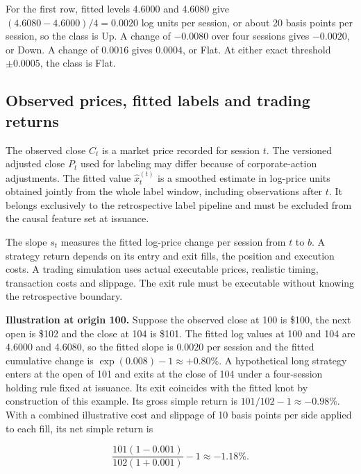 \documentclass[10pt,letterpaper]{article}
\begin{document}
For the first row, fitted levels 4.6000 and 4.6080 give \((4.6080-4.6000)/4=0.0020\) log units per session, or about 20 basis points per session, so the class is Up. A change of \(-0.0080\) over four sessions gives \(-0.0020\), or Down. A change of \(0.0016\) gives \(0.0004\), or Flat. At either exact threshold \(\pm0.0005\), the class is Flat.\par

\clearpage

\subsection*{Observed prices, fitted labels and trading returns}

The observed close \(C_t\) is a market price recorded for session \(t\). The versioned adjusted close \(P_t\) used for labeling may differ because of corporate-action adjustments. The fitted value \(\widehat x_t^{(t)}\) is a smoothed estimate in log-price units obtained jointly from the whole label window, including observations after \(t\). It belongs exclusively to the retrospective label pipeline and must be excluded from the causal feature set at issuance.\par

The slope \(s_t\) measures the fitted log-price change per session from \(t\) to \(b\). A strategy return depends on its entry and exit fills, the position and execution costs. A trading simulation uses actual executable prices, realistic timing, transaction costs and slippage. The exit rule must be executable without knowing the retrospective boundary.\par

\textbf{Illustration at origin 100.} Suppose the observed close at 100 is \$100, the next open is \$102 and the close at 104 is \$101. The fitted log values at 100 and 104 are 4.6000 and 4.6080, so the fitted slope is \(0.0020\) per session and the fitted cumulative change is \(\exp(0.008)-1\approx+0.80\%\). A hypothetical long strategy enters at the open of 101 and exits at the close of 104 under a four-session holding rule fixed at issuance. Its exit coincides with the fitted knot by construction of this example. Its gross simple return is \(101/102-1\approx-0.98\%\). With a combined illustrative cost and slippage of 10 basis points per side applied to each fill, its net simple return is\par

\[
\frac{101(1-0.001)}{102(1+0.001)}-1\approx-1.18\%.
\]
\end{document}
